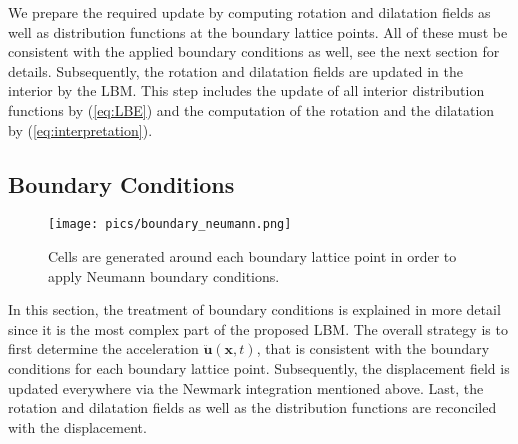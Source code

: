 \documentclass{article}
\renewcommand{\vec}{\boldsymbol}        %
\newcommand{\argum}{(\vec{x},t)}
\begin{document}
We prepare the required update by computing rotation and dilatation fields as well as distribution functions at the boundary lattice points. All of these must be consistent with the applied boundary conditions as well, see the next section for details. %
Subsequently, the rotation and dilatation fields are updated in the interior by the LBM. This step includes the update of all interior distribution functions by (\ref{eq:LBE}) and the computation of the rotation and the dilatation by (\ref{eq:interpretation}).


\subsection{Boundary Conditions}

\begin{figure}
    \centering
    \texttt{[image: pics/boundary\_neumann.png]}
    \caption{Cells are generated around each boundary lattice point in order to apply Neumann boundary conditions.}
    \label{fig:boundary_neumann}
\end{figure}




In this section, the treatment of boundary conditions is explained in more detail since it is the most complex part of the proposed LBM. The overall strategy is to first determine the acceleration $\ddot{\vec{u}}\argum$, that is consistent with the boundary conditions for each boundary lattice point. Subsequently, the displacement field is updated everywhere via the Newmark integration mentioned above. Last, the rotation and dilatation fields as well as the distribution functions are reconciled with the displacement. 
\end{document}
